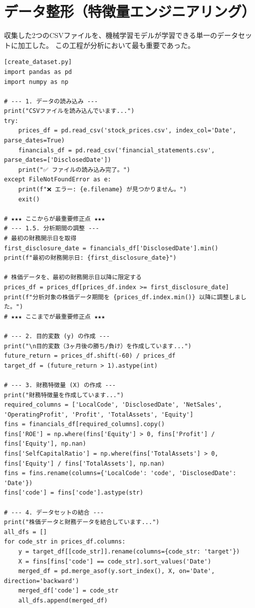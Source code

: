 \documentclass[a4paper, 11pt]{ltjsarticle}
\begin{document}
\section{データ整形（特徴量エンジニアリング）}
収集した2つのCSVファイルを、機械学習モデルが学習できる単一のデータセットに加工した。
この工程が分析において最も重要であった。

\begin{verbatim}
[create_dataset.py]
import pandas as pd
import numpy as np

# --- 1. データの読み込み ---
print("CSVファイルを読み込んでいます...")
try:
    prices_df = pd.read_csv('stock_prices.csv', index_col='Date', parse_dates=True)
    financials_df = pd.read_csv('financial_statements.csv', parse_dates=['DisclosedDate'])
    print("✅ ファイルの読み込み完了。")
except FileNotFoundError as e:
    print(f"❌ エラー: {e.filename} が見つかりません。")
    exit()

# ★★★ ここからが最重要修正点 ★★★
# --- 1.5. 分析期間の調整 ---
# 最初の財務開示日を取得
first_disclosure_date = financials_df['DisclosedDate'].min()
print(f"最初の財務開示日: {first_disclosure_date}")

# 株価データを、最初の財務開示日以降に限定する
prices_df = prices_df[prices_df.index >= first_disclosure_date]
print(f"分析対象の株価データ期間を {prices_df.index.min()} 以降に調整しました。")
# ★★★ ここまでが最重要修正点 ★★★

# --- 2. 目的変数 (y) の作成 ---
print("\n目的変数（3ヶ月後の勝ち/負け）を作成しています...")
future_return = prices_df.shift(-60) / prices_df
target_df = (future_return > 1).astype(int)

# --- 3. 財務特徴量 (X) の作成 ---
print("財務特徴量を作成しています...")
required_columns = ['LocalCode', 'DisclosedDate', 'NetSales', 'OperatingProfit', 'Profit', 'TotalAssets', 'Equity']
fins = financials_df[required_columns].copy()
fins['ROE'] = np.where(fins['Equity'] > 0, fins['Profit'] / fins['Equity'], np.nan)
fins['SelfCapitalRatio'] = np.where(fins['TotalAssets'] > 0, fins['Equity'] / fins['TotalAssets'], np.nan)
fins = fins.rename(columns={'LocalCode': 'code', 'DisclosedDate': 'Date'})
fins['code'] = fins['code'].astype(str)

# --- 4. データセットの結合 ---
print("株価データと財務データを結合しています...")
all_dfs = []
for code_str in prices_df.columns:
    y = target_df[[code_str]].rename(columns={code_str: 'target'})
    X = fins[fins['code'] == code_str].sort_values('Date')
    merged_df = pd.merge_asof(y.sort_index(), X, on='Date', direction='backward')
    merged_df['code'] = code_str
    all_dfs.append(merged_df)


\end{verbatim}
\end{document}
